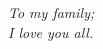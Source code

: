 \cleardoublepage
\thispagestyle{empty}
\begin{center}
\Large\itshape
To my family;\\
I love you all.
\end{center}
